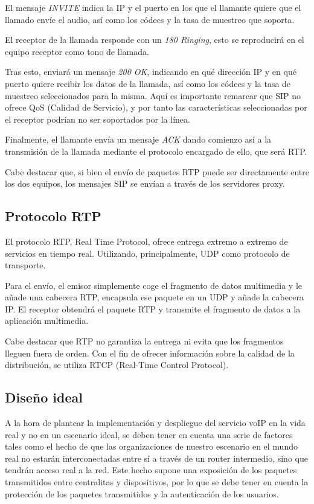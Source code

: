 \documentclass[a4paper]{article}
\begin{document}
 El mensaje \textit{INVITE} indica la IP y el puerto en los que el llamante quiere que el llamado envíe el audio, así como los códecs y la tasa de muestreo que soporta.


 El receptor de la llamada responde con un \textit{180 Ringing}, esto se reproducirá en el equipo receptor como tono de llamada.

  Tras esto, enviará un mensaje \textit{200 OK}, indicando en qué dirección IP y en qué puerto quiere recibir los datos de la llamada, así como los códecs y la tasa de muestreo seleccionados para la misma. Aquí es importante remarcar que SIP no ofrece QoS (Calidad de Servicio), y por tanto las características
seleccionadas por el receptor podrían no ser soportados por la línea.

 
Finalmente, el llamante envía un mensaje \textit{ACK} dando comienzo así a la transmisión de la llamada mediante el protocolo encargado de ello, que será RTP.

 
Cabe destacar que, si bien el envío de paquetes RTP puede ser directamente entre los dos equipos, los mensajes SIP se envían a través de los servidores proxy.

\subsection{Protocolo RTP}
El protocolo RTP, Real Time Protocol, ofrece entrega extremo a extremo de servicios
en tiempo real. Utilizando, principalmente, UDP como protocolo de transporte.

 
Para el envío, el emisor simplemente coge el fragmento de datos multimedia y le añade una cabecera RTP, encapsula ese paquete en un UDP y añade la cabecera IP. El receptor obtendrá el paquete RTP y transmite el fragmento de datos a la aplicación multimedia.

 
Cabe destacar que RTP no garantiza la entrega ni evita que los fragmentos lleguen fuera de orden. Con el fin de ofrecer información sobre la calidad de la distribución, se utiliza RTCP (Real-Time Control Protocol).

\subsection{Diseño ideal}
A la hora de plantear la implementación y despliegue del servicio voIP en la vida real y no en un escenario ideal, se deben tener en cuenta una serie de factores tales como el hecho de que las organizaciones de nuestro escenario en el mundo real no estarán interconectadas entre sí a través de un router intermedio, sino que tendrán acceso real a la red. Este hecho supone una exposición de los paquetes transmitidos entre centralitas y dispositivos, por lo que se debe tener en cuenta la protección de los paquetes transmitidos y la autenticación de los usuarios.
\end{document}
